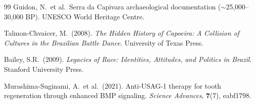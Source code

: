 \documentclass[14pt, twoside, openright]{book}
\theoremstyle{definition}
\theoremstyle{remark}
\begin{document}
\begin{thebibliography}{99}
Guidon, N.\ et al.\ Serra da Capivara archaeological documentation
($\sim$25,000--30,000 BP). UNESCO World Heritage Centre.

Talmon-Chvaicer, M.\ (2008).
\textit{The Hidden History of Capoeira: A Collision of Cultures in the Brazilian
Battle Dance}. University of Texas Press.

Bailey, S.R.\ (2009).
\textit{Legacies of Race: Identities, Attitudes, and Politics in Brazil}.
Stanford University Press.

Murashima-Suginami, A.\ et al.\ (2021).
Anti-USAG-1 therapy for tooth regeneration through enhanced BMP signaling.
\textit{Science Advances}, \textbf{7}(7), eabf1798.

\end{thebibliography}
\end{document}
